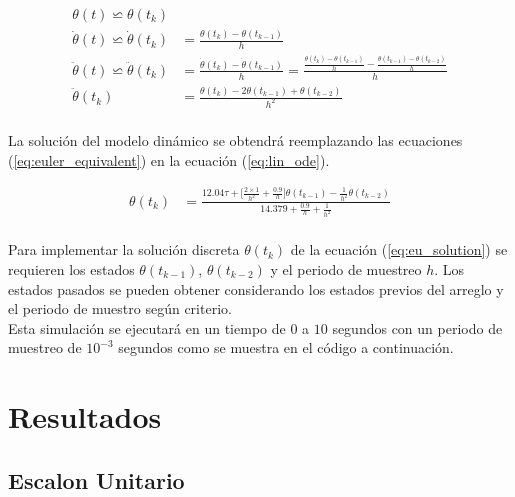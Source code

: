 \documentclass[12pt]{article}
\begin{document}
\begin{equation}
    \begin{split}
        \theta(t)\backsimeq \theta(t_{k})\\
        \dot{\theta}(t)\backsimeq \dot{\theta}(t_{k})&=\frac{\theta(t_{k})-\theta(t_{k-1})}{h}\\
        \ddot{\theta}(t)\backsimeq\ddot{\theta}(t_{k})&=\frac{\dot{\theta}(t_{k})-\dot{\theta}(t_{k-1})}{h}=\frac{\frac{\theta(t_{k})-\theta(t_{k-1})}{h}-\frac{\theta(t_{k-1})-\theta(t_{k-2})}{h}}{h}\\
        \ddot{\theta}(t_{k})&=\frac{\theta(t_{k})-2\theta(t_{k-1})+\theta(t_{k-2})}{h^2}\\
    \end{split}
    \label{eq:euler_equivalent}
\end{equation}

La solución del modelo dinámico se obtendrá reemplazando las ecuaciones (\ref{eq:euler_equivalent}) en la ecuación (\ref{eq:lin_ode}).

\begin{equation}
    \begin{split}
        \theta(t_{k})&=\frac{12.04\tau+\lbrack\frac{2\times1}{h^2}+\frac{0.9}{h}\rbrack\theta(t_{k-1})-\frac{1}{h^2}\theta(t_{k-2})}{14.379+\frac{0.9}{h}+\frac{1}{h^2}}\\
    \end{split}
    \label{eq:eu_solution}
\end{equation}

Para implementar la solución discreta $\theta(t_{k})$ de la ecuación (\ref{eq:eu_solution}) se requieren los estados $\theta(t_{k-1})$,  $\theta(t_{k-2})$ y el periodo de muestreo $h$. Los estados pasados se pueden obtener considerando los estados previos del arreglo y el periodo de muestro según criterio.
\\
Esta simulación se ejecutará en un tiempo de $0$ a $10$ segundos con un periodo de muestreo de $10^{-3}$ segundos como se muestra en el código a continuación.



\section{Resultados}


\subsection{Escalon Unitario}
\end{document}

